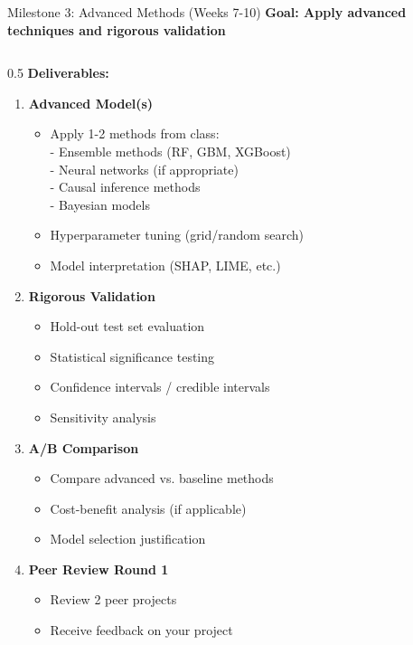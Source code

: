 
\begin{frame}{Milestone 3: Advanced Methods (Weeks 7-10)}
\textbf{Goal: Apply advanced techniques and rigorous validation}

\begin{columns}
\begin{column}{0.5\textwidth}
\textbf{Deliverables:}

\begin{enumerate}
\item \textbf{Advanced Model(s)}
   \begin{itemize}
   \item Apply 1-2 methods from class:\\
   \quad - Ensemble methods (RF, GBM, XGBoost)\\
   \quad - Neural networks (if appropriate)\\
   \quad - Causal inference methods\\
   \quad - Bayesian models
   \item Hyperparameter tuning (grid/random search)
   \item Model interpretation (SHAP, LIME, etc.)
   \end{itemize}

\item \textbf{Rigorous Validation}
   \begin{itemize}
   \item Hold-out test set evaluation
   \item Statistical significance testing
   \item Confidence intervals / credible intervals
   \item Sensitivity analysis
   \end{itemize}

\item \textbf{A/B Comparison}
   \begin{itemize}
   \item Compare advanced vs. baseline methods
   \item Cost-benefit analysis (if applicable)
   \item Model selection justification
   \end{itemize}

\item \textbf{Peer Review Round 1}
   \begin{itemize}
   \item Review 2 peer projects
   \item Receive feedback on your project
   \end{itemize}
\end{enumerate}
\end{column}


\end{columns}
\end{frame}
